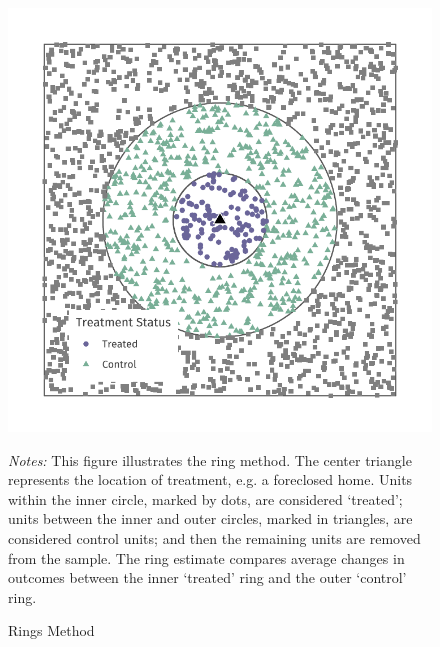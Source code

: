 \documentclass[12pt]{article}
\begin{document}

\begin{figure}[tb]
  \caption{Rings Method}
  \label{fig:example-id}

  \begin{adjustbox}{width = 0.4\textwidth, center}
      \includegraphics[width=\textwidth]{../../figures/example_id.pdf}
  \end{adjustbox}

  {\footnotesize
    \emph{Notes:} This figure illustrates the ring method. The center triangle represents the location of treatment, e.g. a foreclosed home. Units within the inner circle, marked by dots, are considered `treated'; units between the inner and outer circles, marked in triangles, are considered control units; and then the remaining units are removed from the sample. The ring estimate compares average changes in outcomes between the inner `treated' ring and the outer `control' ring.
  }
\end{figure}
\end{document}
